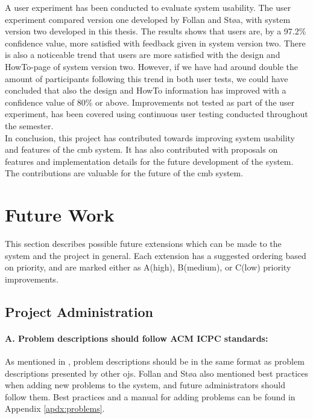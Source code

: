 A user experiment has been conducted to evaluate system usability. The user experiment compared version one developed by Follan and Støa, with system version two developed in this thesis. The results shows that users are, by a 97.2\% confidence value, more satisfied with feedback given in system version two. There is also a noticeable trend that users are more satisfied with the design and HowTo-page of system version two. However, if we have had around double the amount of participants following this trend in both user tests, we could have concluded that also the design and HowTo information has improved with a confidence value of 80\% or above. Improvements not tested as part of the user experiment, has been covered using continuous user testing conducted throughout the semester. \\

In conclusion, this project has contributed towards improving system usability and features of the \gls{cmb} system. It has also contributed with proposals on features and implementation details for the future development of the system. The contributions are valuable for the future of the \gls{cmb} system.


\section{Future Work}
\label{sec:future-work}
This section describes possible future extensions which can be made to the system and the project in general. Each extension has a suggested ordering based on priority, and are marked either as A(high), B(medium), or C(low) priority improvements.

\subsection*{Project Administration}

\paragraph*{A. Problem descriptions should follow ACM ICPC standards:} As mentioned in , problem descriptions should be in the same format as problem descriptions presented by other \glspl{oj}. Follan and Støa also mentioned best practices when adding new problems to the system, and future administrators should follow them. Best practices and a manual for adding problems can be found in Appendix \ref{apdx:problems}.

